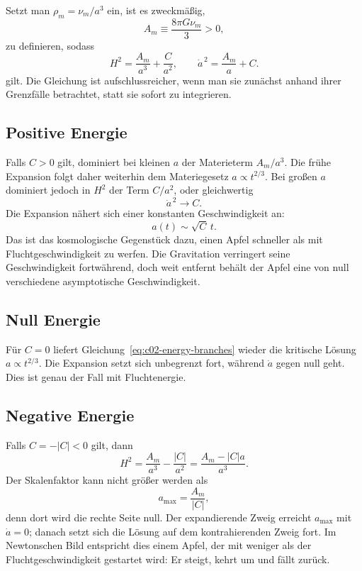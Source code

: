 Setzt man \(\rho_m=\nu_m/a^3\) ein, ist es zweckmäßig, \begin{equation}
A_m\equiv\frac{8\pi G\nu_m}{3}>0,
\end{equation} zu definieren, sodass
\begin{equation}
H^2=\frac{A_m}{a^3}+\frac{C}{a^2},
\qquad
\dot a^{\,2}=\frac{A_m}{a}+C.
\label{eq:c02-energy-branches}
\end{equation}
gilt. Die Gleichung ist aufschlussreicher, wenn man sie zunächst anhand ihrer Grenzfälle betrachtet, statt sie sofort zu integrieren.

\subsection{Positive Energie}

Falls \(C>0\) gilt, dominiert bei kleinen \(a\) der Materieterm \(A_m/a^3\). Die frühe Expansion folgt daher weiterhin dem Materiegesetz \(a\propto t^{2/3}\). Bei großen \(a\) dominiert jedoch in \(H^2\) der Term \(C/a^2\), oder gleichwertig
\begin{equation}
\dot a^{\,2}\longrightarrow C.
\end{equation}
Die Expansion nähert sich einer konstanten Geschwindigkeit an:
\begin{equation}
a(t)\sim\sqrt C\,t.
\label{eq:c02-positive-late}
\end{equation}
Das ist das kosmologische Gegenstück dazu, einen Apfel schneller als mit Fluchtgeschwindigkeit zu werfen. Die Gravitation verringert seine Geschwindigkeit fortwährend, doch weit entfernt behält der Apfel eine von null verschiedene asymptotische Geschwindigkeit.

\subsection{Null Energie}

Für \(C=0\) liefert Gleichung~\eqref{eq:c02-energy-branches} wieder die kritische Lösung \(a\propto t^{2/3}\). Die Expansion setzt sich unbegrenzt fort, während \(\dot a\) gegen null geht. Dies ist genau der Fall mit Fluchtenergie.

\subsection{Negative Energie}

Falls \(C=-|C|<0\) gilt, dann
\begin{equation}
H^2=\frac{A_m}{a^3}-\frac{|C|}{a^2}
=\frac{A_m-|C|a}{a^3}.
\label{eq:c02-negative-energy}
\end{equation}
Der Skalenfaktor kann nicht größer werden als
\begin{equation}
a_{\max}=\frac{A_m}{|C|},
\label{eq:c02-amax}
\end{equation}
denn dort wird die rechte Seite null. Der expandierende Zweig erreicht \(a_{\max}\) mit \(\dot a=0\); danach setzt sich die Lösung auf dem kontrahierenden Zweig fort. Im Newtonschen Bild entspricht dies einem Apfel, der mit weniger als der Fluchtgeschwindigkeit gestartet wird: Er steigt, kehrt um und fällt zurück.

